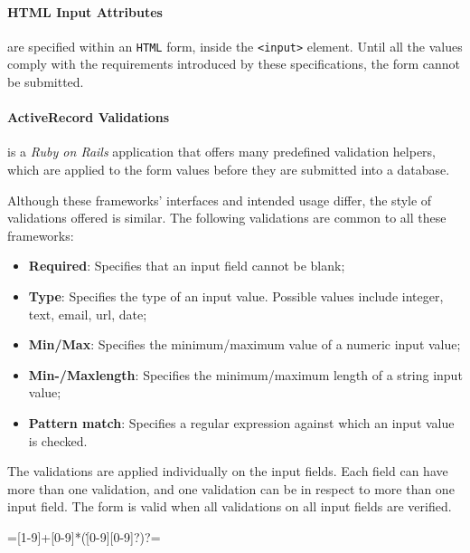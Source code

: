 \paragraph{HTML Input Attributes\protect\footnotemark}  are specified within an \texttt{HTML} form, inside the \texttt{<input>} element. Until all the values comply with the requirements introduced by these specifications, the form cannot be submitted.

\paragraph{ActiveRecord Validations\protect\footnotemark}  is a \textit{Ruby on Rails} application that offers many predefined validation helpers, which are applied to the form values before they are submitted into a database.


\medskip
\noindent
Although these frameworks' interfaces and intended usage differ, the style of validations offered is similar. The following validations are common to all these frameworks:

\begin{itemize}
  \item \textbf{Required}: Specifies that an input field cannot be blank;
  \item \textbf{Type}: Specifies the type of an input value. Possible values include integer, text, email, url, date;
  \item \textbf{Min/Max}: Specifies the minimum/maximum value of a numeric input value;
  \item \textbf{Min-/Maxlength}: Specifies the minimum/maximum length of a string input value;
  \item \textbf{Pattern match}: Specifies a regular expression against which an input value is checked.
\end{itemize}

\noindent
The validations are applied individually on the input fields. Each field can have more than one validation, and one validation can be in respect to more than one input field. The form is valid when all validations on all input fields are verified.

=[1-9]+[0-9]*(\.[0-9][0-9]?)?=

